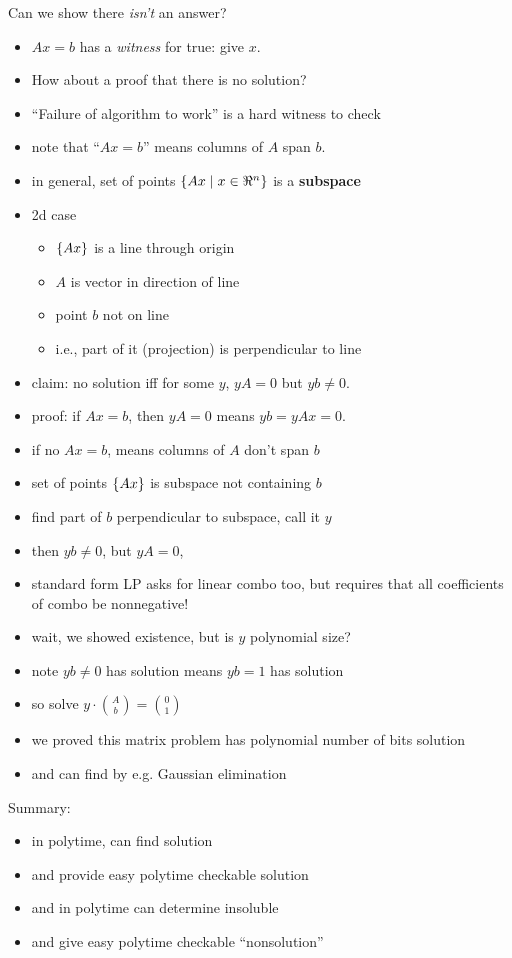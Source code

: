 \documentclass{article}
\begin{document}
Can we show there \emph{isn't} an answer?
\begin{itemize}
\item $Ax=b$ has a {\em witness} for true: give $x$.
\item How about a proof that there is no solution?
\item ``Failure of algorithm to work'' is a hard witness to check
\item note that ``$Ax=b$'' means columns of $A$ span $b$.
\item in general, set of points $\{ Ax \mid x \in \Re^n \} $ is a
  {\bf subspace}
\item 2d case
\begin{itemize}
\item $\{ Ax \}$ is a line through origin
\item $A$ is vector in direction of line
\item point $b$ not on line
\item i.e., part of it (projection) is perpendicular to line
\end{itemize}
\item claim: no solution iff for some $y$, $yA=0$ but $yb \ne 0$.
\item proof: if $Ax=b$, then $yA=0$ means $yb=yAx=0$.
\item if no $Ax = b$, means columns of $A$ don't span $b$
\item set of points $\{ Ax \}$ is subspace not containing $b$
\item find part of $b$ perpendicular to subspace, call it $y$
\item then $yb \ne 0$, but $yA=0$,
\item standard form LP asks for linear combo too, but requires that all
  coefficients of combo be nonnegative!
\item wait, we showed existence, but is $y$ polynomial size?
\item note $yb \ne 0 $ has solution means $yb=1$ has solution
\item so solve $y \cdot \binom{A}{b} = \binom{0}{1}$
\item we proved this matrix problem has polynomial number of bits
  solution
\item and can find by e.g. Gaussian elimination
\end{itemize}

Summary:
\begin{itemize}
\item in polytime, can find solution
\item and provide easy polytime checkable solution
\item and in polytime can determine insoluble
\item and give easy polytime checkable ``nonsolution''
\end{itemize}
\end{document}
